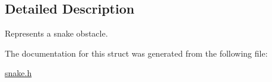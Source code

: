 \subsection{Detailed Description}
Represents a snake obstacle. 

The documentation for this struct was generated from the following file\+:\begin{DoxyCompactItemize}
\item 
\mbox{\hyperlink{snake_8h}{snake.\+h}}\end{DoxyCompactItemize}

